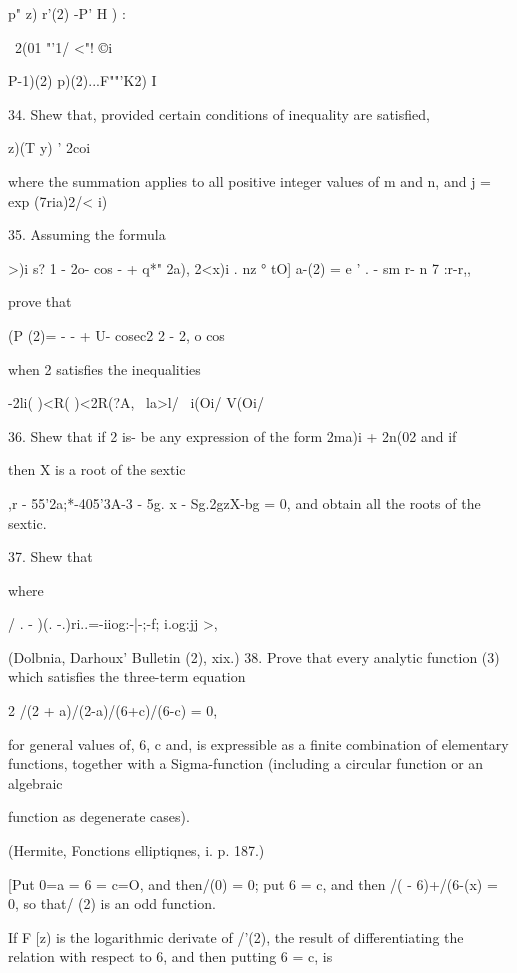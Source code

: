 {{p" z) r'(2) -P' H ) :

\ 2(01 "'1/ <"! ©i

P-1)(2) p)(2)...F""'K2) I


34. Shew that, provided certain conditions of inequality are
satisfied,

  z)(T y) ' 2coi

where the summation applies to all positive integer values of m and n,
and j = exp (7ria)2/< i)


35. Assuming the formula

>)i s? 1 - 2o- cos - + q*" 2a), 2<x)i . nz ° tO] a-(2) = e ' . - sm
r- n 7 :r-r,,

prove that

(P (2)= - - + U- cosec2 2 - 2, o cos

when 2 satisfies the inequalities

-2li( )<R( )<2R(?A, \ la>l/ \ i(Oi/ V(Oi/


%
%

36. Shew that if 2 is- be any expression of the form 2ma)i + 2n(02 and
if

then X is a root of the sextic

,r - 55'2a;*-405'3A-3 - 5g. x - Sg.2gzX-bg = 0, and obtain all the
roots of the sextic. 

37. Shew that

where

/ . - )(. -.)ri..=-iiog:-|-;-f; i.og:jj >,

(Dolbnia, Darhoux' Bulletin (2), xix.) 38. Prove that every analytic
function (3) which satisfies the three-term equation

2 /(2 + a)/(2-a)/(6+c)/(6-c) = 0,

for general values of, 6, c and, is expressible as a finite
combination of elementary functions, together with a Sigma-function
(including a circular function or an algebraic

function as degenerate cases).

(Hermite, Fonctions elliptiqnes, i. p. 187.)

[Put 0=a = 6 = c=O, and then/(0) = 0; put 6 = c, and then /( -
6)+/(6-(x) = 0, so that/ (2) is an odd function.

If F [z) is the logarithmic derivate of /'(2), the result of
differentiating the relation with respect to 6, and then putting 6 =
c, is

}}
